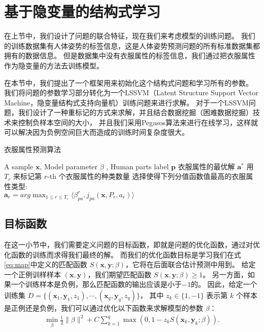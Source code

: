 \section{基于隐变量的结构式学习}
在上节中，我们设计了问题的联合特征，现在我们来考虑模型的训练问题。
我们的训练数据集有人体姿势的标签信息，这是人体姿势预测问题的所有标准数据集都拥有的数据信息。
但是数据集中没有衣服属性的标签信息，我们通过把衣服属性作为隐变量的方法去训练模型。

在本节中，我们提出了一个框架用来初始化这个结构式问题和学习所有的参数。
我们将问题的参数学习部分转化为一个LSSVM（Latent Structure Support Vector Machine，隐变量结构式支持向量机）训练问题来进行求解。
对于一个LSSVM问题，我们设计了一种重标记的方式来求解，并且结合数据挖掘（困难数据挖掘）技术来控制负样本空间的大小，
并且我们采用Pegasos\cite{pegasos}算法来进行在线学习，这样就可以解决因为负例空间巨大而造成的训练时间复杂度很大。

\begin{algorithm}
\caption{衣服属性预测算法}
\begin{algorithmic}[1]
    \REQUIRE A sample $\mathbf{x}$, Model parameter $\beta$ , Human parts label $\mathbf{p}$
    \ENSURE 衣服属性的最优解 $\mathbf{a^*}$
    \STATE 用 $T_r$ 来标记第 $r$-th 个衣服属性的种类数量
        \STATE 选择使得下列分值函数值最高的衣服属性类型:\\
            $\mathbf{a}_r = arg \max_{1 \leq r \leq T_r} \langle \beta_{pa}^r, j_{pa}(\mathbf{x}, P_r, a_r) \rangle $
    \ENDFOR
\end{algorithmic}
\label{alg:attr}
\end{algorithm}


\subsection{目标函数}
在这一小节中，我们需要定义问题的目标函数，即就是问题的优化函数，通过对优化函数的训练而求得我们最终的解。
而我们的优化函数目标是学习我们在式\ref{eq:map}中定义的匹配函数 $S(\mathbf{x}, \mathbf{y}; \beta)$，它将在后面联合估计预测中用到。
给定一个正例训样样本 $(\mathbf{x}, \mathbf{y})$，我们期望匹配函数 $S(\mathbf{x}, \mathbf{y}; \beta) \geq 1$。
另一方面，如果一个训练样本是负例，那么匹配函数的输出应该是小于$-1$的。
因此，给定一个训练集 $D = \{ (\mathbf{x}_1, \mathbf{y}_1, z_1), \cdots, (\mathbf{x}_q, \mathbf{y}_q, z_q) \}$， 其中 $z_k \in \{1, -1\}$ 表示第 $k$ 个样本是正例还是负例，我们可以通过优化以下函数来求解模型的参数 $\beta$：
\begin{equation}
\begin{split}
\min_{\beta}  \frac{1}{2} \|\beta\|^2 + C \sum_{k=1}^{q}\max(0, 1 - z_k S(\mathbf{x}_k, \mathbf{y}_k; \beta)).
    \label{eq:latent}
\end{split}
\end{equation}

